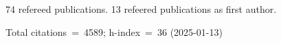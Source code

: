 74 refereed publications. 13 refeered publications as first author.

Total citations~=~4589; h-index~=~36 (2025-01-13)